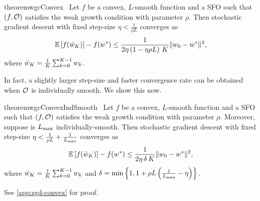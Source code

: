 \begin{restatable}{theorem}{wgcConvex}~\label{thm:wgc-convex}
    Let \( f \) be a convex, \( L \)-smooth function and \oracle{} a SFO such that \( \rbr{f, \oracle{}} \) satisfies the weak growth condition with parameter \( \rho \).
    Then stochastic gradient descent with fixed step-size \( \eta < \frac{1}{\rho L} \) converges as
    \[ \E\sbr{\f(\bar \w_K)} - f(\wopt) \leq \frac{1}{2 \eta \rbr{1 - \eta \rho L} \, K} \norm{\w_0 - \wopt}^2, \]
    where \( \bar \w_K = \frac{1}{K} \sum_{k=0}^{K-1} \wk \). 
\end{restatable}

In fact, a slightly larger step-size and faster convergence rate can be obtained when \( \oracle{} \) is individually smooth.
We show this now.

\begin{restatable}{theorem}{wgcConvexIndSmooth}~\label{thm:wgc-convex-ind-smooth}
    Let \( f \) be a convex, \( L \)-smooth function and \oracle{} a SFO such that \( \rbr{f, \oracle{}} \) satisfies the weak growth condition with parameter \( \rho \).
    Moreover, suppose \oracle{} is \( \Lmax \) individually-smooth. 
    Then stochastic gradient descent with fixed step-size \( \eta < \frac{1}{\rho L} + \frac{1}{\Lmax} \) converges as
    \[ \E\sbr{f(\bar w_K)} - f(\wopt) \leq \frac{1}{2\eta \, \delta \, K} \norm{\w_0 - \wopt}^2,   \]
    where \( \bar \w_K = \frac{1}{K} \sum_{k=0}^{K-1} \wk \) and \( \delta = \min \cbr{ 1, 1 + \rho L \rbr{\frac{1}{\Lmax} - \eta }} \). 
\end{restatable}
\noindent See \autoref{app:sgd-convex} for proof. \hfill \break

